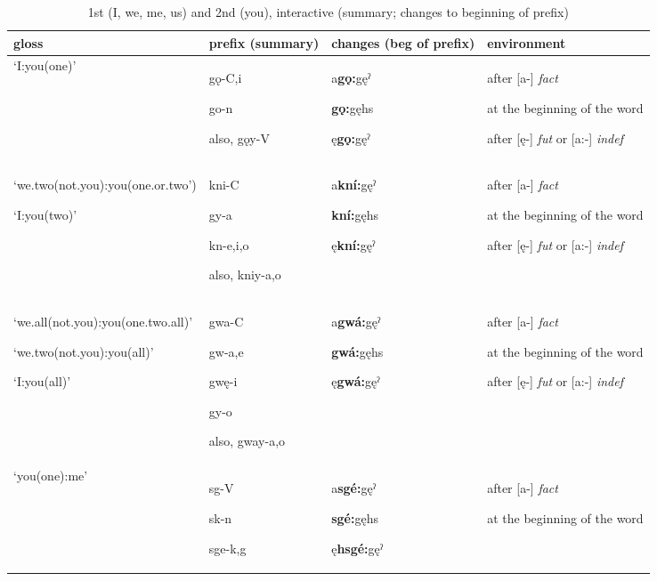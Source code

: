 \begin{table}
\caption{1st (I, we, me, us) and 2nd (you), interactive (summary; changes to beginning of prefix)}
\label{tab:1:12pron}
\tiny{
\begin{tabularx}{\textwidth}{XXXX}
\lsptoprule
gloss & prefix (summary) & changes (beg of prefix) & environment\\
\midrule
‘I:you(one)’ & gǫ-C,i

go-n

also, gǫy-V & a\textbf{gǫ:}gęˀ

\textbf{gǫ:}gęhs

ę\textbf{gǫ:}gęˀ & after [a-] \textit{fact}

at the beginning of the word 

after [ę-] \textit{fut} or [a:-] \textit{indef}\\
‘we.two(not.you):you(one.or.two’)

‘I:you(two)’ & kni-C

gy-a 

kn-e,i,o

also, kniy-a,o & a\textbf{kní:}gęˀ

\textbf{kní:}gęhs

ę\textbf{kní:}gęˀ & after [a-] \textit{fact}

at the beginning of the word 

after [ę-] \textit{fut} or [a:-] \textit{indef}\\
‘we.all(not.you):you(one.two.all)’

‘we.two(not.you):you(all)’

‘I:you(all)’ & gwa-C

gw-a,e

gwę-i

gy-o

also, gway-a,o & a\textbf{gwá:}gęˀ

\textbf{gwá:}gęhs

ę\textbf{gwá:}gęˀ & after [a-] \textit{fact}

at the beginning of the word  

after [ę-] \textit{fut} or [a:-] \textit{indef}\\
‘you(one):me’ & sg-V

sk-n

sge-k,g & a\textbf{sgé:}gęˀ

\textbf{sgé:}gęhs

ę\textbf{hsgé:}gęˀ & after [a-] \textit{fact}

at the beginning of the word 


\end{tabularx}}
\end{table}
